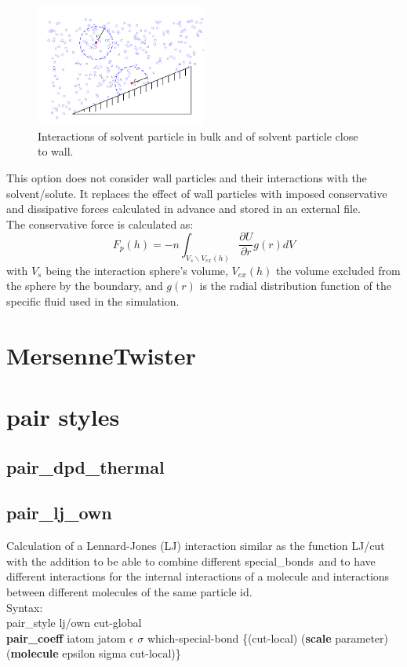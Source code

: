 \documentclass[a4paper,10pt]{scrreprt}
\begin{document}
\begin{figure}
\includegraphics[width=0.5\textwidth]{wallNeighbours.pdf}
\caption{Interactions of solvent particle in bulk and of solvent particle close to wall.\label{fig:wallNeighbours}}
\end{figure}

This option does not consider wall particles and their interactions with the solvent/solute. It replaces the effect of wall particles with imposed conservative and dissipative forces calculated in advance and stored in an external file.\\The conservative force is calculated as:
\begin{equation}
\label{eq:wall_cons_force}
F_p(h) = -n \int_{V_s\backslash V_{ex}(h)} \frac{\partial U}{\partial r} g(r) dV
\end{equation}
with $V_s$ being the interaction sphere's volume, $V_{ex}(h)$ the volume excluded from the sphere by the boundary, and $g(r)$ is the radial distribution function of the specific fluid used in the simulation.

\section{MersenneTwister}

\section{pair styles}

\subsection{pair\_dpd\_thermal}


\subsection{pair\_lj\_own}

Calculation of a Lennard-Jones (LJ) interaction similar as the function LJ/cut with the addition to be able to combine different \glqq special\_bonds\grqq\ and to have different interactions for the internal interactions of a molecule and interactions between different molecules of the same particle id.
\\[2ex]
Syntax:
\\[1ex]
pair\_style lj/own cut-global
\\[2ex]
\textbf{pair\_coeff} iatom jatom $\epsilon$ $\sigma$ which-special-bond \{(cut-local) (\textbf{scale} parameter) (\textbf{molecule} epsilon sigma cut-local)\}
\end{document}
